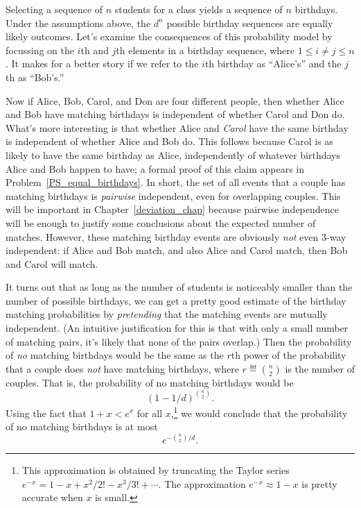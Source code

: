 Selecting a sequence of $n$ students for a class yields a sequence of
$n$ birthdays.  Under the assumptions above, the $d^n$ possible
birthday sequences are equally likely outcomes.  Let's examine the
consequences of this probability model by focussing on the $i$th and
$j$th elements in a birthday sequence, where $1 \leq i \neq j \leq n$.
It makes for a better story if we refer to the $i$th birthday as
``Alice's'' and the $j$th as ``Bob's.''

Now if Alice, Bob, Carol, and Don are four different people, then
whether Alice and Bob have matching birthdays is independent of
whether Carol and Don do.  What's more interesting is that whether
Alice and \emph{Carol} have the same birthday is independent of
whether Alice and Bob do.  This follows because Carol is as likely to
have the same birthday as Alice, independently of whatever birthdays
Alice and Bob happen to have; a formal proof of this claim appears in
Problem~\ref{PS_equal_birthdays}.  In short, the set of all events
that a couple has matching birthdays is 
\emph{pairwise} independent, even for overlapping couples.  This will
be important in Chapter~\ref{deviation_chap} because pairwise
independence will be enough to justify some conclusions about the
expected number of matches.  However, these matching birthday events
are obviously \emph{not} even 3-way independent: if Alice and Bob
match, and also Alice and Carol match, then Bob and Carol will match.

\iffalse
We could justify all these assertions of independence using the four
step method, but it's pretty boring, and we'll skip it.
\fi

It turns out that as long as the number of students is noticeably
smaller than the number of possible birthdays, we can get a pretty
good estimate of the birthday matching probabilities by
\emph{pretending} that the matching events are mutually independent.
(An intuitive justification for this is that with only a small number
of matching pairs, it's likely that none of the pairs overlap.)  Then
the probability of \emph{no} matching birthdays would be the same as
the $r$th power of the probability that a couple does \emph{not} have
matching birthdays, where $r \eqdef \binom{n}{2}$ is the number of
couples.  That is, the probability of no matching birthdays would be
\begin{equation}\label{11dbinn2}
(1-1/d)^{\binom{n}{2}}.
\end{equation}
Using the fact that $1+x < e^x$ for all $x$,\footnote{This
  approximation is obtained by truncating the Taylor series $e^{-x} =
  1 - x + x^2/2!  - x^3/3! + \cdots$.  The approximation $e^{-x}
  \approx 1 - x$ is pretty accurate when $x$ is small.} we would conclude
that the probability of no matching birthdays is at most
\begin{equation}\label{bday-approx}
e^{-\binom{n}{2}/d}.
\end{equation}

